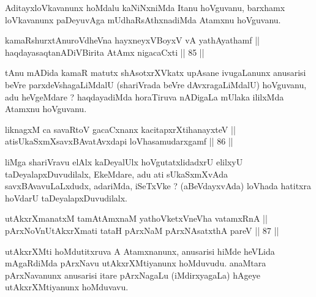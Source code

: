 \begin{artha}
AditayxloVkavanunx hoMdalu kaNiNxniMda Itanu
hoVguvanu, barxhamx loVkavanunx paDeyuvAga mUdhaRsAthxnadiMda Atamxnu
hoVguvanu.
\end{artha}


	
\begin{shl}
kamaRshurxtAnuroVdheVna hayxneyxVBoyxV vA yathAyathamf || \\
haqdayasaqtanADiVBirita AtAmx nigacaCxti \hfill || 85 ||   
\end{shl}

\begin{artha}
tAnu mADida kamaR matutx shAsotxrXVkatx upAsane ivugaLanunx anusarisi
beVre parxdeVshagaLiMdalU (shariVrada beVre dAvxragaLiMdalU)
hoVguvanu, adu heVgeMdare ? haqdayadiMda horaTiruva nADigaLa mUlaka
ililxMda Atamxnu hoVguvanu.
\end{artha}


\begin{shl}
liknagxM ca savaRtoV gacaCxnanx kacitapxrXtihanayxteV || \\
atisUkaSxmXsavxBAvatAvxdapi loVhasamudarxgamf \hfill || 86 ||  
\end{shl}

\begin{artha}
liMga shariVravu elAlx kaDeyalUlx hoVgutatxlidadxrU elilxyU
taDeyalapxDuvudilalx, EkeMdare, adu ati sUkaSxmXvAda
savxBAvavuLaLxdudx, adariMda, iSeTxVke ? (aBeVdayxvAda) loVhada
hatitxra hoVdarU taDeyalapxDuvudilalx.
\end{artha}


\begin{shl}
utAkxrXmanatxM tamAtAmxnaM yathoVketxVneVha vatamxRnA || \\
pArxNoV\s nUtAkxrXmati tataH pArxNaM pArxNAsatxthA pareV \hfill || 87 ||  
\end{shl}

\begin{artha}
utAkxrXMti hoMdutitxruva A Atamxnanunx, anusarisi hiMde heVLida
mAgaRdiMda pArxNavu utAkxrXMtiyanunx hoMduvudu. anaMtara pArxNavanunx
anusarisi itare pArxNagaLu (iMdirxyagaLa) hAgeye utAkxrXMtiyanunx hoMduvavu.
\end{artha}

